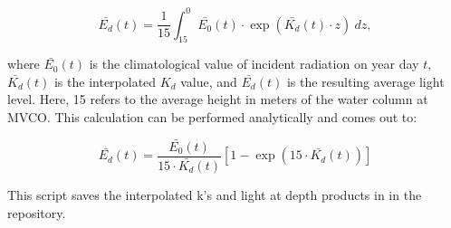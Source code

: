 \documentclass[11pt]{article}
\begin{document}
\begin{equation}
\bar{E_d}(t) = \frac{1}{15} \int_{15}^{0} \bar{E_0}(t) \cdot \exp(\bar{K_d}(t) \cdot z)~dz,
\end{equation}

\noindent where $\bar{E_0}(t)$ is the climatological value of incident radiation on year day $t$, $\bar{K_d}(t)$ is the interpolated $K_d$ value, and $\bar{E_d}(t)$ is the resulting average light level. Here, 15 refers to the average height in meters of the water column at MVCO.
This calculation can be performed analytically and comes out to:

\begin{equation}
\bar{E_d}(t) = \frac{\bar{E_0}(t)}{15 \cdot \bar{K_d}(t)} \left[ 1 - \exp(15 \cdot \bar{K_d}(t)) \right]
\end{equation}

\noindent This script saves the interpolated k's and light at depth products in  in the repository.
\end{document}
